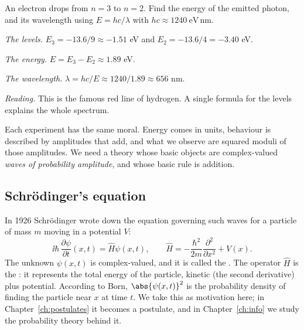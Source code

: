 \begin{example}\label{ex:hydrogen-line}
  An electron drops from $n=3$ to $n=2$. Find the energy of the emitted photon, and its wavelength using $E=hc/\lambda$ with $hc\approx1240\ \mathrm{eV\,nm}$.
\end{example}
\begin{solution}
  \begin{steps}
    \item \emph{The levels.} $E_3=-13.6/9\approx-1.51$ eV and $E_2=-13.6/4=-3.40$ eV.
    \item \emph{The energy.} $E=E_3-E_2\approx1.89$ eV.
    \item \emph{The wavelength.} $\lambda=hc/E\approx1240/1.89\approx656$ nm.
    \item \emph{Reading.} This is the famous red line of hydrogen. A single formula for the levels explains the whole spectrum.
  \end{steps}
\end{solution}

Each experiment has the same moral. Energy comes in units, behaviour is described by amplitudes that add, and what we observe are squared moduli of those amplitudes. We need a theory whose basic objects are complex-valued \emph{waves of probability amplitude}, and whose basic rule is addition.

\subsection{Schr\"odinger's equation}

In 1926 Schr\"odinger wrote down the equation governing such waves for a particle of mass $m$ moving in a potential $V$:
\begin{equation}\label{eq:schrodinger}
  \ii\hbar\,\frac{\partial\psi}{\partial t}(x,t)=\hat H\psi(x,t),\qquad\hat H=-\frac{\hbar^2}{2m}\frac{\partial^2}{\partial x^2}+V(x).
\end{equation}
The unknown $\psi(x,t)$ is complex-valued, and it is called the . The operator $\hat H$ is the : it represents the total energy of the particle, kinetic (the second derivative) plus potential. According to Born, $\abs{\psi(x,t)}^2$ is the probability density of finding the particle near $x$ at time $t$. We take this as motivation here; in Chapter~\ref{ch:postulates} it becomes a postulate, and in Chapter~\ref{ch:info} we study the probability theory behind it.

